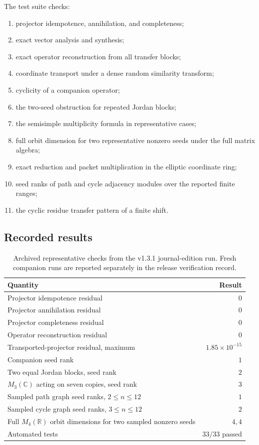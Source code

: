 \documentclass[11pt]{article}
\newcommand{\R}{\mathbb R}\newcommand{\C}{\mathbb C}\newcommand{\Z}{\mathbb Z}\newcommand{\N}{\mathbb N}
\theoremstyle{definition}
\theoremstyle{remark}
\theoremstyle{definition}\newtheorem{example}[theorem]{Example}
\begin{document}
The test suite checks:
\begin{enumerate}[label=(\roman*)]
\item projector idempotence, annihilation, and completeness;
\item exact vector analysis and synthesis;
\item exact operator reconstruction from all transfer blocks;
\item coordinate transport under a dense random similarity transform;
\item cyclicity of a companion operator;
\item the two-seed obstruction for repeated Jordan blocks;
\item the semisimple multiplicity formula in representative cases;
\item full orbit dimension for two representative nonzero seeds under the full matrix algebra;
\item exact reduction and packet multiplication in the elliptic coordinate ring;
\item seed ranks of path and cycle adjacency modules over the reported finite ranges;
\item the cyclic residue transfer pattern of a finite shift.
\end{enumerate}

\subsection{Recorded results}

\begin{table}[htbp]
\centering
\caption{Archived representative checks from the v1.3.1 journal-edition run. Fresh companion runs are reported separately in the release verification record.}
\label{tab:results}
\begin{tabular}{L{0.57\textwidth}r}
\toprule
Quantity & Result \\
\midrule
Projector idempotence residual & $0$ \\
Projector annihilation residual & $0$ \\
Projector completeness residual & $0$ \\
Operator reconstruction residual & $0$ \\
Transported-projector residual, maximum & $1.85\times10^{-15}$ \\
Companion seed rank & $1$ \\
Two equal Jordan blocks, seed rank & $2$ \\
$M_3(\C)$ acting on seven copies, seed rank & $3$ \\
Sampled path graph seed ranks, $2\le n\le12$ & $1$ \\
Sampled cycle graph seed ranks, $3\le n\le12$ & $2$ \\
Full $M_4(\R)$ orbit dimensions for two sampled nonzero seeds & $4,4$ \\
Automated tests & $33/33$ passed \\
\bottomrule
\end{tabular}
\end{table}
\end{document}
